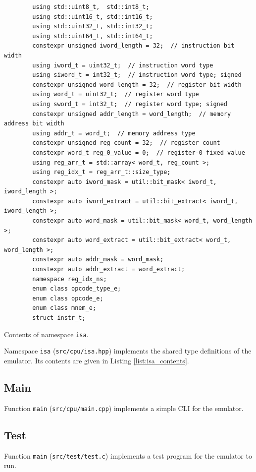 \documentclass[a4paper]{amsart}
\begin{document}
\begin{listing}
    \begin{verbatim}
        using std::uint8_t,  std::int8_t;
        using std::uint16_t, std::int16_t;
        using std::uint32_t, std::int32_t;
        using std::uint64_t, std::int64_t;
        constexpr unsigned iword_length = 32;  // instruction bit width
        using iword_t = uint32_t;  // instruction word type
        using siword_t = int32_t;  // instruction word type; signed
        constexpr unsigned word_length = 32;  // register bit width
        using word_t = uint32_t;  // register word type
        using sword_t = int32_t;  // register word type; signed
        constexpr unsigned addr_length = word_length;  // memory address bit width
        using addr_t = word_t;  // memory address type
        constexpr unsigned reg_count = 32;  // register count
        constexpr word_t reg_0_value = 0;  // register-0 fixed value
        using reg_arr_t = std::array< word_t, reg_count >;
        using reg_idx_t = reg_arr_t::size_type;
        constexpr auto iword_mask = util::bit_mask< iword_t, iword_length >;
        constexpr auto iword_extract = util::bit_extract< iword_t, iword_length >;
        constexpr auto word_mask = util::bit_mask< word_t, word_length >;
        constexpr auto word_extract = util::bit_extract< word_t, word_length >;
        constexpr auto addr_mask = word_mask;
        constexpr auto addr_extract = word_extract;
        namespace reg_idx_ns;
        enum class opcode_type_e;
        enum class opcode_e;
        enum class mnem_e;
        struct instr_t;
    \end{verbatim}
    \caption{Contents of namespace \texttt{isa}.}
    \label{list:isa_contents}
\end{listing}

\noindent
Namespace \texttt{isa} (\texttt{src/cpu/isa.hpp}) implements the shared type definitions of the emulator.
Its contents are given in Listing \ref{list:isa_contents}.


\medbreak
\subsection{Main}
\noindent
Function \texttt{main} (\texttt{src/cpu/main.cpp}) implements a simple CLI for the emulator.


\medbreak
\subsection{Test}
\noindent
Function \texttt{main} (\texttt{src/test/test.c}) implements a test program for the emulator to run.
\end{document}
